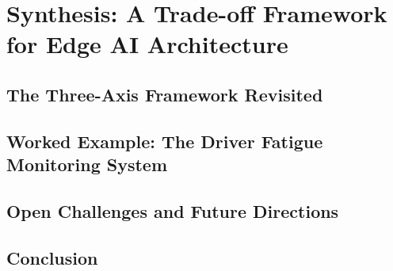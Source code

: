\chapter{Synthesis: A Trade-off Framework for Edge AI Architecture}
\label{ch:synthesis}


\section{The Three-Axis Framework Revisited}

\section{Worked Example: The Driver Fatigue Monitoring System}

\section{Open Challenges and Future Directions}

\section{Conclusion}

